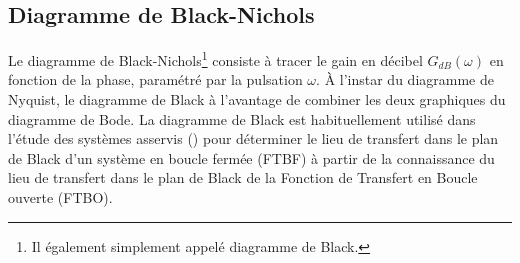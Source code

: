 \subsection{Diagramme de Black-Nichols}

Le diagramme de Black-Nichols\footnote{Il également simplement appelé diagramme 
de Black.} consiste à tracer le gain en décibel $G_{dB}(\omega)$ en fonction de 
la phase, paramétré par la pulsation $\omega$. À l'instar du diagramme de 
Nyquist, le diagramme de Black à l'avantage de combiner les deux graphiques 
du diagramme de Bode. La diagramme de Black est habituellement utilisé dans 
l'étude des systèmes asservis () pour déterminer le lieu 
de transfert dans le plan de Black d'un système en boucle fermée (FTBF) à 
partir de la connaissance du lieu de transfert dans le plan de Black de la 
Fonction de Transfert en Boucle ouverte (FTBO).

